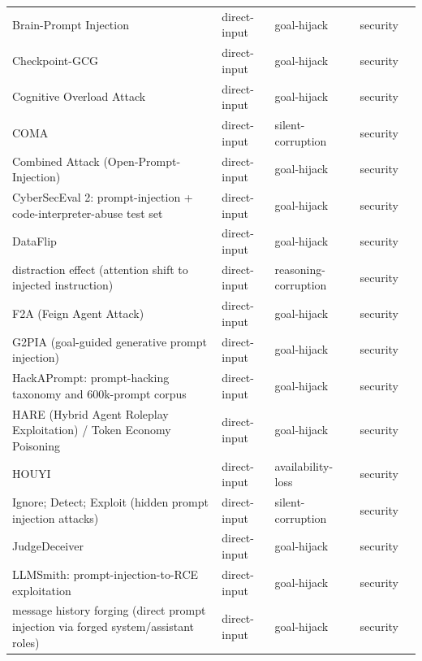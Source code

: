 \begin{longtable}{@{}p{}llll@{}}
Brain-Prompt Injection & direct-input & goal-hijack & security & \cite{tai-2026-brainprompt} \\
Checkpoint-GCG & direct-input & goal-hijack & security & \cite{yang-2025-checkpointgcg} \\
Cognitive Overload Attack & direct-input & goal-hijack & security & \cite{upadhayay-2024-cognitive} \\
COMA & direct-input & silent-corruption & security & \cite{liu-2025-compression} \\
Combined Attack (Open-Prompt-Injection) & direct-input & goal-hijack & security & \cite{liu-2023-formalizing} \\
CyberSecEval 2: prompt-injection + code-interpreter-abuse test set & direct-input & goal-hijack & security & \cite{bhatt-2024-cyberseceval} \\
DataFlip & direct-input & goal-hijack & security & \cite{choudhary-2025-not} \\
distraction effect (attention shift to injected instruction) & direct-input & reasoning-corruption & security & \cite{hung-2024-attention} \\
F2A (Feign Agent Attack) & direct-input & goal-hijack & security & \cite{ren-2024-f2a} \\
G2PIA (goal-guided generative prompt injection) & direct-input & goal-hijack & security & \cite{zhang-2024-goalguided} \\
HackAPrompt: prompt-hacking taxonomy and 600k-prompt corpus & direct-input & goal-hijack & security & \cite{schulhoff-2023-ignore} \\
HARE (Hybrid Agent Roleplay Exploitation) / Token Economy Poisoning & direct-input & goal-hijack & security & \cite{muhil-2025-evaluating} \\
HOUYI & direct-input & availability-loss & security & \cite{liu-2023-promptb} \\
Ignore; Detect; Exploit (hidden prompt injection attacks) & direct-input & silent-corruption & security & \cite{collu-2025-misleading} \\
JudgeDeceiver & direct-input & goal-hijack & security & \cite{shi-2024-optimizationbased} \\
LLMSmith: prompt-injection-to-RCE exploitation & direct-input & goal-hijack & security & \cite{liu-2023-demystifying} \\
message history forging (direct prompt injection via forged system/assistant roles) & direct-input & goal-hijack & security & \cite{kaya-2025-meets} \\

\end{longtable}
